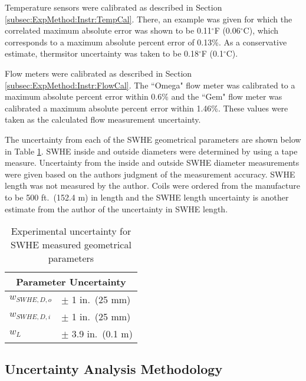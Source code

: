 Temperature sensors were calibrated as described in Section \ref{subsec:ExpMethod:Instr:TempCal}. There, an example was given for which the correlated maximum absolute error was shown to be 0.11$^\circ$F (0.06$^\circ$C), which corresponds to a maximum absolute percent error of 0.13\%. As a conservative estimate, thermsitor uncertainty was taken to be 0.18$^\circ$F (0.1$^\circ$C).

Flow meters were calibrated as described in Section \ref{subsec:ExpMethod:Instr:FlowCal}. The ``Omega" flow meter was calibrated to a maximum absolute percent error within 0.6\%  and the ``Gem" flow meter was calibrated a maximum absolute percent error within 1.46\%. These values were taken as the calculated flow measurement uncertainty.

The uncertainty from each of the SWHE geometrical parameters are shown below in Table \ref{tab:ExpResult:Uncertainty:Parameters}. SWHE inside and outside diameters were determined by using a tape measure. Uncertainty from the inside and outside SWHE diameter measurements were given based on the authors judgment of the measurement accuracy. SWHE length was not measured by the author. Coils were ordered from the manufacture to be 500 ft.\ (152.4 m) in length and the SWHE length uncertainty is another estimate from the author of the uncertainty in SWHE length.

\begin{table}[h]
	\centering
	\caption{Experimental uncertainty for SWHE measured geometrical parameters}
	\label{tab:ExpResult:Uncertainty:Parameters}
	\begin{tabular}{l|l}
		\hline
		\multicolumn{2}{c}{Parameter Uncertainty} \\
		\hline\hline
		$w_{SWHE,D,o}$ & $\pm$ 1 in.\ (25 mm) \\
		\hline
		$w_{SWHE,D,i}$ & $\pm$ 1 in.\ (25 mm) \\
		\hline
		$w_{L}$ & $\pm$ 3.9 in.\ (0.1 m) \\
		\hline	
	\end{tabular}
\end{table}

\subsection{Uncertainty Analysis Methodology}
\label{subsec:ExpResult:Uncertainty:Method}

